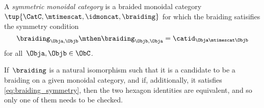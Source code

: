 \begin{ctdefinition}
    \label{def:sym-mon-cat}
    A \emph{symmetric monoidal category} is a braided monoidal category~$\tup{\CatC,\mtimescat,\idmoncat, \braiding}$ for which the braiding satisifies the symmetry condition
    \begin{equation}
        \label{eq:braiding-symmetry}
        \braiding_{\Obja,\Objb} \mthen \braiding_{\Objb,\Obja} = \catid_{\Obja \mtimescat \Objb}
    \end{equation}
    for all~$\Obja, \Objb \in \ObC$.
\end{ctdefinition}

\begin{remark}
    If~$\braiding$ is a natural isomorphism such that it is a candidate to be a braiding on a given monoidal category, and if, additionally, it satisfies \cref{eq:braiding_symmetry}, then the two hexagon identities are equivalent, and so only one of them needs to be checked.
\end{remark}
